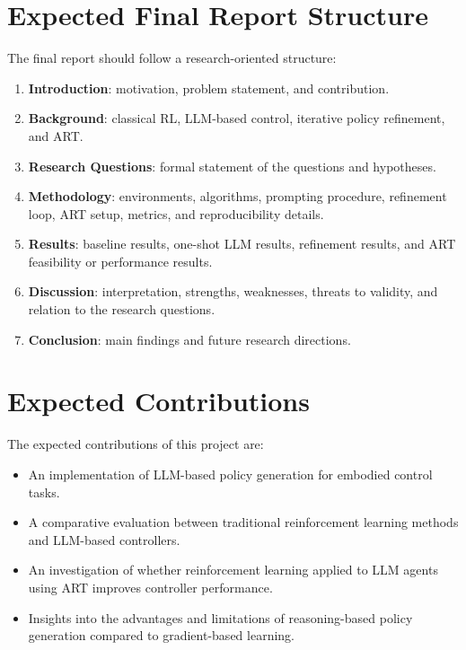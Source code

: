 \documentclass[12pt]{article}
\begin{document}
\section{Expected Final Report Structure}

The final report should follow a research-oriented structure:

\begin{enumerate}
    \item \textbf{Introduction}: motivation, problem statement, and contribution.
    \item \textbf{Background}: classical RL, LLM-based control, iterative policy refinement, and ART.
    \item \textbf{Research Questions}: formal statement of the questions and hypotheses.
    \item \textbf{Methodology}: environments, algorithms, prompting procedure, refinement loop, ART setup, metrics, and reproducibility details.
    \item \textbf{Results}: baseline results, one-shot LLM results, refinement results, and ART feasibility or performance results.
    \item \textbf{Discussion}: interpretation, strengths, weaknesses, threats to validity, and relation to the research questions.
    \item \textbf{Conclusion}: main findings and future research directions.
\end{enumerate}

\section{Expected Contributions}

The expected contributions of this project are:

\begin{itemize}
\item An implementation of LLM-based policy generation for embodied control tasks.
\item A comparative evaluation between traditional reinforcement learning methods and LLM-based controllers.
\item An investigation of whether reinforcement learning applied to LLM agents using ART improves controller performance.
\item Insights into the advantages and limitations of reasoning-based policy generation compared to gradient-based learning.
\end{itemize}
\end{document}
